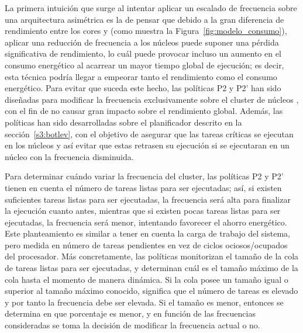 La primera intuición que surge al intentar aplicar un escalado de
frecuencia sobre una arquitectura asimétrica es la de pensar que debido a
la gran diferencia de rendimiento entre los cores \BIG y \LITTLE (como
muestra la Figura~\ref{fig:modelo_consumo}), aplicar una reducción de
frecuencia a los núcleos \BIG puede suponer una pérdida significativa de
rendimiento, lo cuál puede provocar incluso un aumento en el consumo
energético al acarrear un mayor tiempo global de ejecución; es decir, esta
técnica podría llegar a empeorar tanto el rendimiento como el consumo
energético. Para evitar que suceda este hecho, las políticas P2 y P2' han
sido diseñadas para modificar la frecuencia exclusivamente sobre el cluster
de núcleos \LITTLE, con el fin de no causar gran impacto sobre el
rendimiento global. Además, las políticas han sido desarrolladas sobre el
planificador \botlev descrito en la sección~\ref{s3:botlev}, con el
objetivo de asegurar que las tareas críticas se ejecutan en los núcleos
\BIG y así evitar que estas retrasen su ejecución si se ejecutaran en un
núcleo \LITTLE con la frecuencia disminuida.

Para determinar cuándo variar la frecuencia del cluster, las políticas P2 y
P2' tienen en cuenta el número de tareas listas para ser ejecutadas; así, si
existen suficientes tareas listas para ser ejecutadas, la frecuencia será
alta para finalizar la ejecución cuanto antes, mientras que si existen
pocas tareas listas para ser ejecutadas, la frecuencia será menor,
intentando favorecer el ahorro energético. Este planteamiento es similar a
tener en cuenta la carga de trabajo del sistema, pero medida en número de
tareas pendientes en vez de ciclos ociosos/ocupados del procesador. Más
concretamente, las políticas monitorizan el tamaño de la cola de tareas
listas para ser ejecutadas, y determinan cuál es el tamaño máximo de la
cola hasta el momento de manera dinámica. Si la cola posee un tamaño igual
o superior al tamaño máximo conocido, significa que el número de tareas es
elevado y por tanto la frecuencia debe ser elevada. Si el tamaño es menor,
entonces se determina en que porcentaje es menor, y en función de las
frecuencias consideradas se toma la decisión de modificar la frecuencia
actual o no.

